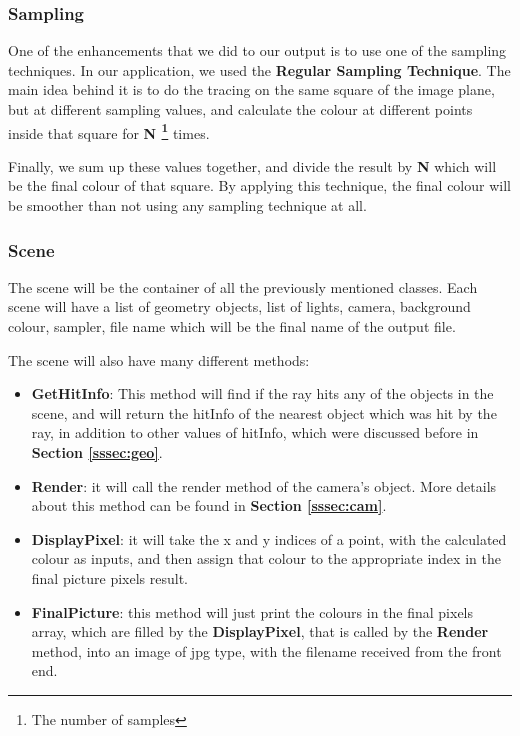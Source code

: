 \documentclass[a4paper]{article}
\begin{document}
	\subsubsection{Sampling}
	One of the enhancements that we did to our output is to use one of the sampling techniques. In our application, we used the \textbf{Regular Sampling Technique}. The main idea behind it is to do the tracing on the same square of the image plane, but at different sampling values, and calculate the colour at different points inside that square for \textbf{N \footnote{The number of samples}} times.\\
	\par Finally, we sum up these values together, and divide the result by \textbf{N} which will be the final colour of that square. By applying this technique, the final colour will be smoother than not using any sampling technique at all.
	\subsubsection{Scene}
	The scene will be the container of all the previously mentioned classes. Each scene will have a list of geometry objects, list of lights, camera, background colour, sampler, file name which will be the final name of the output file.\\
	\par The scene will also have many different methods:
	\begin{itemize}
		\item \textbf{GetHitInfo}: This method will find if the ray hits any of the objects in the scene, and will return the hitInfo of the nearest object which was hit by the ray, in addition to other values of hitInfo, which were discussed before in \textbf{Section \ref{sssec:geo}}.
		\item \textbf{Render}: it will call the render method of the camera's object. More details about this method can be found in \textbf{Section \ref{sssec:cam}}.
		\item \textbf{DisplayPixel}: it will take the x and y indices of a point, with the calculated colour as inputs, and then assign that colour to the appropriate index in the final picture pixels result.
		\item \textbf{FinalPicture}: this method will just print the colours in the final pixels array, which are filled by the \textbf{DisplayPixel}, that is called by the \textbf{Render} method, into an image of jpg type, with the filename received from the front end.
	\end{itemize}
\end{document}
